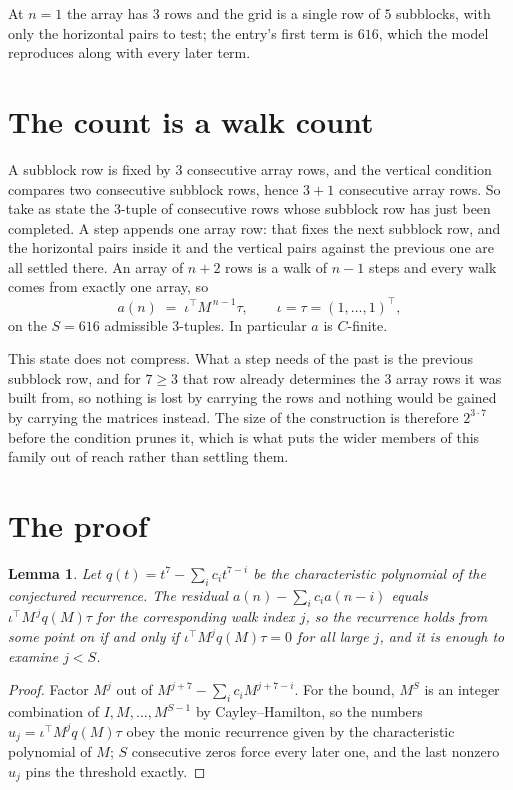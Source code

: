 \documentclass[11pt,a4paper]{article}
\theoremstyle{plain}
\newtheorem{lemma}[theorem]{Lemma}
\theoremstyle{definition}
\begin{document}
At $n=1$ the array has $3$ rows and the grid is a single row of $5$
subblocks, with only the horizontal pairs to test; the entry's first term is
$616$, which the model reproduces along with every later term.

\section{The count is a walk count}

A subblock row is fixed by $3$ consecutive array rows, and the vertical condition compares
two consecutive subblock rows, hence $3+1$ consecutive array rows. So take as state the
$3$-tuple of consecutive rows whose subblock row has just been completed. A step appends one
array row: that fixes the next subblock row, and the horizontal pairs inside it and the
vertical pairs against the previous one are all settled there. An array of $n+2$ rows is
a walk of $n-1$ steps and every walk comes from exactly one array, so
\[
a(n)\;=\;\iota^{\!\top}M^{\,n-1}\tau,\qquad\iota=\tau=(1,\dots,1)^{\!\top},
\]
on the $S=616$ admissible $3$-tuples. In particular $a$ is $C$-finite.

This state does not compress. What a step needs of the past is the previous subblock row, and
for $7\ge3$ that row already determines the $3$ array rows it was built from, so nothing
is lost by carrying the rows and nothing would be gained by carrying the matrices instead. The
size of the construction is therefore $2^{3\cdot7}$ before the condition prunes
it, which is what puts the wider members of this family out of reach rather than settling them.

\section{The proof}

\begin{lemma}\label{lem:crit}
Let $q(t)=t^{7}-\sum_i c_it^{7-i}$ be the characteristic polynomial of the
conjectured recurrence. The residual $a(n)-\sum_ic_ia(n-i)$ equals
$\iota^{\!\top}M^{\,j}q(M)\tau$ for the corresponding walk index $j$, so the recurrence
holds from some point on if and only if $\iota^{\!\top}M^{j}q(M)\tau=0$ for all large $j$,
and it is enough to examine $j<S$.
\end{lemma}

\begin{proof}
Factor $M^{j}$ out of $M^{j+7}-\sum_ic_iM^{j+7-i}$. For the bound, $M^{S}$
is an integer combination of $I,M,\dots,M^{S-1}$ by Cayley--Hamilton, so the numbers
$u_j=\iota^{\!\top}M^{j}q(M)\tau$ obey the monic recurrence given by the characteristic
polynomial of $M$; $S$ consecutive zeros force every later one, and the last nonzero $u_j$
pins the threshold exactly.
\end{proof}
\end{document}
